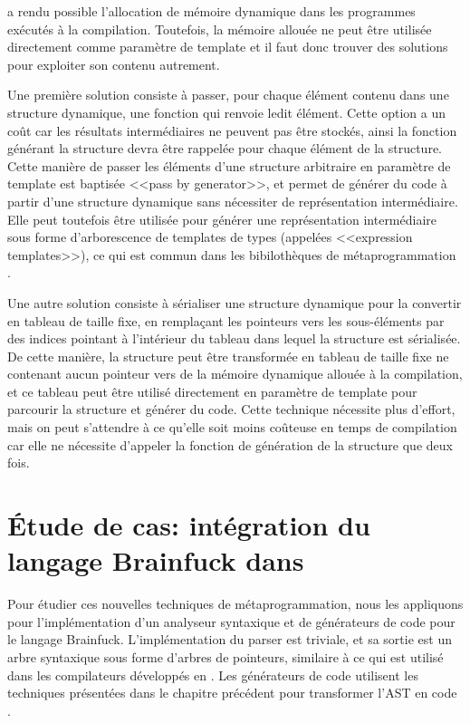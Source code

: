 \documentclass[main]{subfiles}
\begin{document}
 a rendu possible l'allocation de m\'emoire dynamique dans les programmes
\cpp ex\'ecut\'es \`a la compilation. Toutefois, la m\'emoire allou\'ee
ne peut \^etre utilis\'ee directement comme param\`etre de template et
il faut donc trouver des solutions pour exploiter son contenu autrement.

Une premi\`ere solution consiste \`a passer, pour chaque \'el\'ement contenu
dans une structure dynamique, une fonction qui renvoie ledit \'el\'ement.
Cette option a un co\^ut car les r\'esultats interm\'ediaires ne peuvent pas
\^etre stock\'es, ainsi la fonction g\'en\'erant la structure devra \^etre
rappel\'ee pour chaque \'el\'ement de la structure. Cette mani\`ere de passer
les \'el\'ements d'une structure arbitraire en param\`etre de template est
baptis\'ee <<pass by generator>>, et permet de g\'en\'erer du code \`a partir
d'une structure dynamique sans n\'ecessiter de repr\'esentation interm\'ediaire.
Elle peut toutefois \^etre utilis\'ee pour g\'en\'erer une repr\'esentation
interm\'ediaire sous forme d'arborescence de templates de types (appel\'ees
<<expression templates>>), ce qui est commun dans les bibiloth\`eques de
m\'etaprogrammation \cpp.

Une autre solution consiste \`a s\'erialiser une structure dynamique pour
la convertir en tableau de taille fixe, en rempla\c{c}ant les pointeurs vers
les sous-\'el\'ements par des indices pointant \`a l'int\'erieur du tableau
dans lequel la structure est s\'erialis\'ee. De cette mani\`ere, la structure
peut \^etre transform\'ee en tableau de taille fixe ne contenant aucun pointeur
vers de la m\'emoire dynamique allou\'ee \`a la compilation, et ce tableau
peut \^etre utilis\'e directement en param\`etre de template pour parcourir
la structure et g\'en\'erer du code.
Cette technique n\'ecessite plus d'effort, mais on peut s'attendre \`a
ce qu'elle soit moins co\^uteuse en temps de compilation car elle ne n\'ecessite
d'appeler la fonction de g\'en\'eration de la structure que deux fois.

\section{
  \'Etude de cas: int\'egration du langage Brainfuck dans \cpp
}

Pour \'etudier ces nouvelles techniques de m\'etaprogrammation,
nous les appliquons pour l'impl\'ementation d'un analyseur syntaxique et
de g\'en\'erateurs de code pour le langage Brainfuck.
L'impl\'ementation du parser est triviale, et sa sortie est un arbre syntaxique
sous forme d'arbres de pointeurs, similaire \`a ce qui est utilis\'e dans les
compilateurs d\'evelopp\'es en \cpp.
Les g\'en\'erateurs de code utilisent les techniques pr\'esent\'ees
dans le chapitre pr\'ec\'edent pour transformer l'AST en code \cpp.
\end{document}
